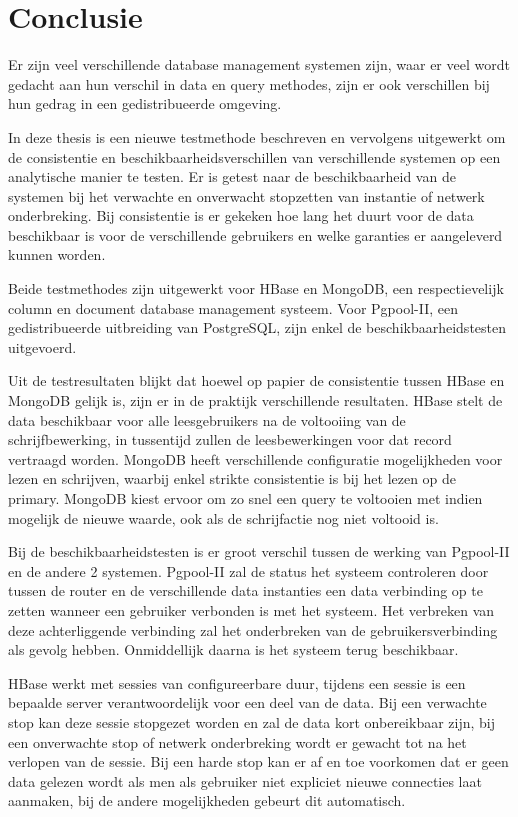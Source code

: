 \chapter{Conclusie}
Er zijn veel verschillende database management systemen zijn, waar er veel wordt gedacht aan hun verschil in data en query methodes, zijn er ook verschillen bij hun gedrag in een gedistribueerde omgeving.

In deze thesis is een nieuwe testmethode beschreven en vervolgens uitgewerkt om de consistentie en beschikbaarheidsverschillen van verschillende systemen op een analytische manier te testen. Er is getest naar de beschikbaarheid van de systemen bij het verwachte en onverwacht stopzetten van instantie of netwerk onderbreking. Bij consistentie is er gekeken hoe lang het duurt voor de data beschikbaar is voor de verschillende gebruikers en welke garanties er aangeleverd kunnen worden. 

Beide testmethodes zijn uitgewerkt voor HBase en MongoDB, een respectievelijk column en document database management systeem. Voor Pgpool-II, een gedistribueerde uitbreiding van PostgreSQL, zijn enkel de beschikbaarheidstesten uitgevoerd. 

Uit de testresultaten blijkt dat hoewel op papier de consistentie tussen HBase en MongoDB gelijk is, zijn er in de praktijk verschillende resultaten. HBase stelt de data beschikbaar voor alle leesgebruikers na de voltooiing van de schrijfbewerking, in tussentijd zullen de leesbewerkingen voor dat record vertraagd worden. MongoDB heeft verschillende configuratie mogelijkheden voor lezen en schrijven, waarbij enkel strikte consistentie is bij het lezen op de primary. MongoDB kiest ervoor om zo snel een query te voltooien met indien mogelijk de nieuwe waarde, ook als de schrijfactie nog niet voltooid is. 

Bij de beschikbaarheidstesten is er groot verschil tussen de werking van Pgpool-II en de andere 2 systemen. Pgpool-II zal de status het systeem controleren door tussen de router en de verschillende data instanties een data verbinding op te zetten wanneer een gebruiker verbonden is met het systeem. Het verbreken van deze achterliggende verbinding zal het onderbreken van de gebruikersverbinding als gevolg hebben. Onmiddellijk daarna is het systeem terug beschikbaar. 

HBase werkt met sessies van configureerbare duur, tijdens een sessie is een bepaalde server verantwoordelijk voor een deel van de data. Bij een verwachte stop kan deze sessie stopgezet worden en zal de data kort onbereikbaar zijn, bij een onverwachte stop of netwerk onderbreking wordt er gewacht tot na het verlopen van de sessie. Bij een harde stop kan er af en toe voorkomen dat er geen data gelezen wordt als men als gebruiker niet expliciet nieuwe connecties laat aanmaken, bij de andere mogelijkheden gebeurt dit automatisch. 

